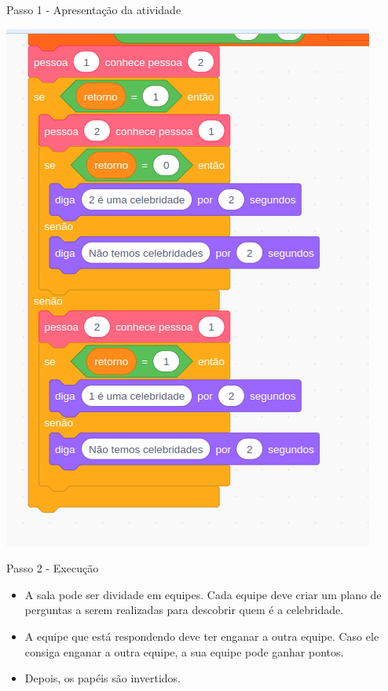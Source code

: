\documentclass{beamer}
\begin{document}
\begin{frame}{Passo 1 - Apresentação da atividade}




\begin{center}
	\includegraphics[scale=0.35]{images/jogo.png} 
\end{center}

    


 

\end{frame}


\begin{frame}{Passo 2 - Execução}

\begin{itemize}

\item <1-> A sala pode ser dividade em equipes. Cada equipe deve criar um plano de perguntas a serem realizadas para descobrir quem é a celebridade.

\item <2-> A equipe que está respondendo deve ter enganar a outra equipe. Caso ele consiga enganar a outra equipe, a sua equipe pode ganhar pontos.

\item <4-> Depois, os papéis são invertidos.

\end{itemize}


\end{frame}
\end{document}
